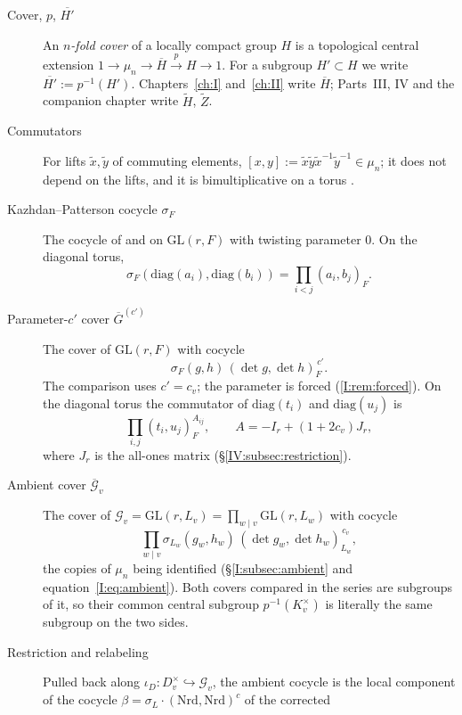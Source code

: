 \begin{description}
\item[Cover, $p$, $\overline{H'}$] An \emph{$n$-fold cover} of a
locally compact group $H$ is a topological central extension
$1\to\mu_n\to\overline H\xrightarrow{\ p\ }H\to1$.  For a subgroup
$H'\subset H$ we write $\overline{H'}:=p^{-1}(H')$.  Chapters~\ref{ch:I} and~\ref{ch:II}
write $\overline H$; Parts~III, IV and the companion chapter write
$\widetilde H$, $\widetilde Z$.
\item[Commutators] For lifts $\tilde x,\tilde y$ of commuting
elements, $[x,y]:=\tilde x\tilde y\tilde x^{-1}\tilde y^{-1}\in\mu_n$;
it does not depend on the lifts, and it is bimultiplicative on a
torus \cite[\S3]{FK86}.
\item[Kazhdan--Patterson cocycle $\sigma_F$] The cocycle of
\cite[\S0.1]{KP84} and \cite[\S2]{FK86} on
$\mathrm{GL}(r,F)$ with twisting parameter $0$.  On the diagonal
torus,
\[
\sigma_F(\mathrm{diag}(a_i),\mathrm{diag}(b_i))=\prod_{i<j}(a_i,b_j)_F.
\]
\item[Parameter-$c'$ cover $\overline G^{(c')}$] The cover of
$\mathrm{GL}(r,F)$ with cocycle
\[
\sigma_F(g,h)\,(\det g,\det h)_F^{\,c'}.
\]
The comparison uses
$c'=c_v$; the parameter is forced (\cref{I:rem:forced}).  On the
diagonal torus the commutator of $\mathrm{diag}(t_i)$ and
$\mathrm{diag}(u_j)$ is
\[
\prod_{i,j}(t_i,u_j)_F^{A_{ij}},\qquad A=-I_r+(1+2c_v)J_r,
\]
where $J_r$ is the all-ones matrix (\S\ref{IV:subsec:restriction}).
\item[Ambient cover $\overline{\mathcal G}_v$] The cover of
$\mathcal G_v=\mathrm{GL}(r,L_v)=\prod_{w\mid v}\mathrm{GL}(r,L_w)$
with cocycle
\[
\prod_{w\mid v}\sigma_{L_w}(g_w,h_w)\,(\det g_w,\det h_w)_{L_w}^{\,c_v},
\]
the copies of $\mu_n$ being identified (\S\ref{I:subsec:ambient} and
equation~\eqref{I:eq:ambient}).  Both covers compared in the series are subgroups of
it, so their common central subgroup $p^{-1}(K_v^\times)$ is literally
the same subgroup on the two sides.
\item[Restriction and relabeling] Pulled back along
$\iota_D:D_v^\times\hookrightarrow\mathcal G_v$, the ambient cocycle
is the local component of the cocycle
$\beta=\sigma_L\cdot(\mathrm{Nrd},\mathrm{Nrd})^c$ of the corrected

\end{description}
